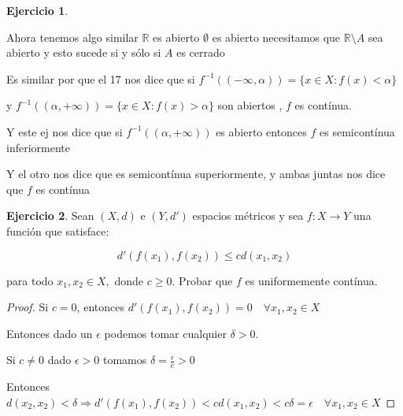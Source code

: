 \documentclass[11pt]{report}
\newcommand{\R}{\mathbb{R}}
\newcommand{\Ra}{\Rightarrow}
\newcommand{\ra}{\rightarrow}
\theoremstyle{definition}
\newtheorem{ej}{Ejercicio}
\begin{document}
\begin{ej}
\begin{enumerate}
				Ahora tenemos algo similar $\R$ es abierto $\emptyset$ es abierto necesitamos que $\R \setminus A$ sea abierto y esto sucede si y sólo si $A$ es cerrado

				Es similar por que el 17 nos dice que si $f^{-1}((- \infty,\alpha)) = \{x\in X : f(x) < \alpha\}$

				y $f^{-1}((\alpha,+\infty)) = \{x\in X : f(x)> \alpha\}$ son abiertos , $f$ es contínua.

				Y este ej nos dice que si $f^{-1}((\alpha,+\infty))$ es abierto entonces $f $ es semicontínua inferiormente

				Y el otro nos dice que es semicontínua superiormente, y ambas juntas nos dice que $f$ es contínua
		\end{enumerate}
	\end{ej}
	
	\begin{ej}
		Sean $(X,d)$ e $(Y,d')$ espacios métricos y sea $f: X \ra Y$ una función que satisface:
		
		$$d'(f(x_1),f(x_2)) \leq c d(x_1,x_2) $$

		para todo $x_1,x_2\in X,$ donde $c \geq 0$. Probar que $f$ es uniformemente contínua.	

		\begin{proof}
			Si $c = 0$, entonces $d'(f(x_1),f(x_2)) = 0 \quad \forall x_1,x_2 \in X$

			Entonces dado un $\epsilon$ podemos tomar cualquier $\delta >0$.

			Si $c \neq 0$ dado $\epsilon > 0$ tomamos $\delta = \frac{\epsilon}{c} > 0$

			Entonces $d(x_2,x_2) < \delta \Ra d'(f(x_1),f(x_2)) < cd(x_1,x_2) < c \delta = \epsilon \quad \forall x_1,x_2 \in X$
		\end{proof}
		
		
	\end{ej}
\end{document}
